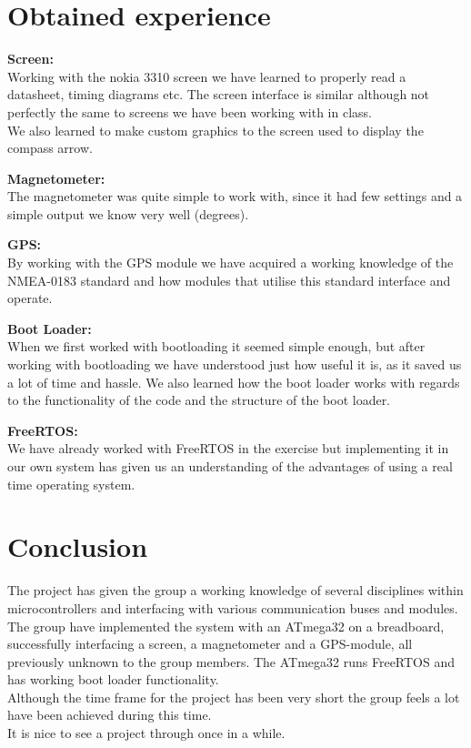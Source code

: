 \chapter{Obtained experience}
\textbf{Screen:}\\
Working with the nokia 3310 screen we have learned to properly read a datasheet, timing diagrams etc. The screen interface is similar although not perfectly the same to screens we have been working with in class.\\
We also learned to make custom graphics to the screen used to display the compass arrow.

\textbf{Magnetometer:}\\
The magnetometer was quite simple to work with, since it had few settings and a simple output we know very well (degrees).

\textbf{GPS:}\\
By working with the GPS module we have acquired a working knowledge of the NMEA-0183 standard and how modules that utilise this standard interface and operate. 

\textbf{Boot Loader:}\\
When we first worked with bootloading it seemed simple enough, but after working with bootloading we have understood just how useful it is, as it saved us a lot of time and hassle. We also learned how the boot loader works with regards to the functionality of the code and the structure of the boot loader.

\textbf{FreeRTOS:}\\
We have already worked with FreeRTOS in the exercise but implementing it in our own system has given us an understanding of the advantages of using a real time operating system. 


\chapter{Conclusion}
The project has given the group a working knowledge of several disciplines within microcontrollers and interfacing with various communication buses and modules.\\
The group have implemented the system with an ATmega32 on a breadboard, successfully interfacing a screen, a magnetometer and a GPS-module, all previously unknown to the group members. The ATmega32 runs FreeRTOS and has working boot loader functionality.\\
Although the time frame for the project has been very short the group feels a lot have been achieved during this time.\\
It is nice to see a project through once in a while.






